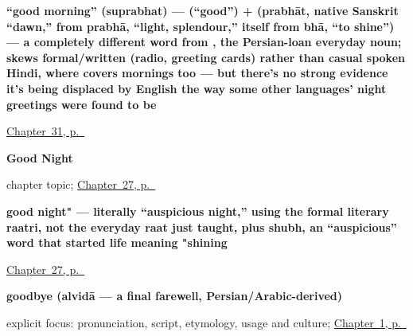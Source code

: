 \noindent\begin{minipage}[t]{\linewidth}
\raggedright
\textbf{\textquotedblleft{}good morning\textquotedblright{} (suprabhat) —  (\textquotedblleft{}good\textquotedblright{}) +  (prabhāt, native Sanskrit \textquotedblleft{}dawn,\textquotedblright{} from prabhā, \textquotedblleft{}light, splendour,\textquotedblright{} itself from bhā, \textquotedblleft{}to shine\textquotedblright{}) — a completely different word from , the Persian-loan everyday noun; skews formal/written (radio, greeting cards) rather than casual spoken Hindi, where  covers mornings too — but there's no strong evidence it's being displaced by English the way some other languages' night greetings were found to be}\enspace\emph{}\par
\footnotesize \hyperref[ch:hi-good-morning]{Chapter~31, p.~\pageref*{ch:hi-good-morning}}
\end{minipage}\par\smallskip

\noindent\begin{minipage}[t]{\linewidth}
\raggedright
\textbf{Good Night}\par
\footnotesize chapter topic; \hyperref[ch:hi-good-night]{Chapter~27, p.~\pageref*{ch:hi-good-night}}
\end{minipage}\par\smallskip

\noindent\begin{minipage}[t]{\linewidth}
\raggedright
\textbf{good night" — literally \textquotedblleft{}auspicious night,\textquotedblright{} using the formal literary raatri, not the everyday raat just taught, plus shubh, an \textquotedblleft{}auspicious\textquotedblright{} word that started life meaning "shining}\enspace\emph{ }\par
\footnotesize \hyperref[ch:hi-good-night]{Chapter~27, p.~\pageref*{ch:hi-good-night}}
\end{minipage}\par\smallskip

\noindent\begin{minipage}[t]{\linewidth}
\raggedright
\textbf{goodbye (alvidā — a final farewell, Persian/Arabic-derived)}\enspace\emph{}\par
\footnotesize explicit focus: pronunciation, script, etymology, usage and culture; \hyperref[ch:greetings]{Chapter~1, p.~\pageref*{ch:greetings}}
\end{minipage}\par\smallskip

